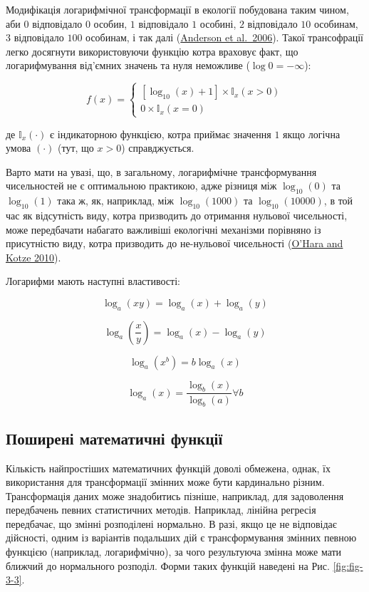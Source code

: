 \documentclass[
  11pt,
]{book}
\begin{document}
Модифікація логарифмічної трансформації в екології побудована таким чином, аби \(0\) відповідало \(0\) особин, \(1\) відповідало \(1\) особині, \(2\) відповідало \(10\) особинам, \(3\) відповідало \(100\) особинам, і так далі (\href{https://doi.org/10.1111/j.1461-0248.2006.00926.x}{Anderson et al.~2006}). Такої трансофрації легко досягнути використовуючи функцію котра враховує факт, що логарифмування від'ємних значень та нуля неможливе (\(\log0 = -\infty\)):

\[f(x) = \begin{cases}
[\log_{10}(x)+1] \times \mathbb{I}_x(x > 0)\\
0 \times \mathbb{I}_x(x = 0)
\end{cases}\]

де \(\mathbb{I}_x(\cdot)\) є індикаторною функцією, котра приймає значення \(1\) якщо логічна умова \((\cdot)\) (тут, що \(x > 0\)) справджується.

Варто мати на увазі, що, в загальному, логарифмічне трансформування чисельностей не є оптимальною практикою, адже різниця між \(\log_{10}(0)\) та \(\log_{10}(1)\) така ж, як, наприклад, між \(\log_{10}(1000)\) та \(\log_{10}(10000)\), в той час як відсутність виду, котра призводить до отримання нульової чисельності, може передбачати набагато важливіші екологічні механізми порівняно із присутністю виду, котра призводить до не-нульової чисельності (\href{https://doi.org/10.1111/j.2041-210X.2010.00021.x}{O'Hara and Kotze 2010}).

Логарифми мають наступні властивості:

\[\log_a(xy) = \log_a(x) + \log_a(y)\]

\[\log_a(\frac{x}{y}) = \log_a(x) - \log_a(y)\]

\[\log_a(x^b) = b \log_a (x)\]

\[\log_a(x) = \frac{\log_b (x)}{\log_b (a)} \forall b\]

\subsection{Поширені математичні функції}\label{ux43fux43eux448ux438ux440ux435ux43dux456-ux43cux430ux442ux435ux43cux430ux442ux438ux447ux43dux456-ux444ux443ux43dux43aux446ux456ux457}

Кількість найпростіших математичних функцій доволі обмежена, однак, їх використання для трансформації змінних може бути кардинально різним. Трансформація даних може знадобитись пізніше, наприклад, для задоволення передбачень певних статистичних методів. Наприклад, лінійна регресія передбачає, що змінні розподілені нормально. В разі, якщо це не відповідає дійсності, одним із варіантів подальших дій є трансформування змінних певною функцією (наприклад, логарифмічно), за чого результуюча змінна може мати ближчий до нормального розподіл. Форми таких функцій наведені на Рис. \ref{fig:fig-3-3}.
\end{document}
